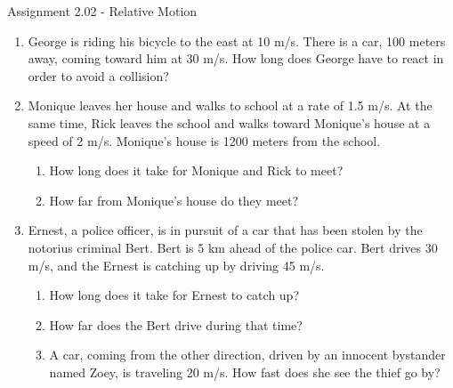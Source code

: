 \documentclass[letterpaper, 12pt]{article}
\begin{document}


\begin{center} Assignment 2.02 - Relative Motion
\end{center}





\begin{enumerate}
\item George is riding his bicycle to the east at 10 m/s.  There is a car, 100 meters away, coming toward him at 30 m/s.  How long does George have to react in order to avoid a collision?
\vspace{0.75in}
\item Monique leaves her house and walks to school at a rate of 1.5 m/s.  At the same time, Rick leaves the school and walks toward Monique's house at a speed of 2 m/s.  Monique's house is 1200 meters from the school.
\begin{enumerate} \item How long does it take for Monique and Rick to meet?
	\vspace{0.75in}
	\item How far from Monique's house do they meet?
\end{enumerate}
\vspace{0.75in}
\item Ernest, a police officer, is in pursuit of a car that has been stolen by the notorius criminal Bert.  Bert is 5 km ahead of the police car.  Bert drives 30 m/s, and the Ernest is catching up by driving 45 m/s.  
\begin{enumerate}
	\item How long does it take for Ernest to catch up?
	\vspace{0.75in}
	\item How far does the Bert drive during that time?
	\vspace{0.75in}
	\item A car, coming from the other direction, driven by an innocent bystander named Zoey, is traveling 20 m/s.  How fast does she see the thief go by?
\end{enumerate}



\end{enumerate}
\end{document}

